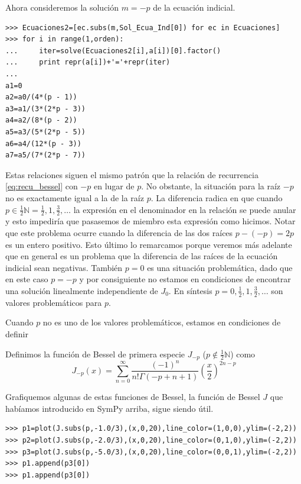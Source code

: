 \documentclass{article}
\begin{document}
Ahora consideremos la solución $m=-p$ de la ecuación indicial.
\begin{lstlisting}
>>> Ecuaciones2=[ec.subs(m,Sol_Ecua_Ind[0]) for ec in Ecuaciones]
>>> for i in range(1,orden):
...     iter=solve(Ecuaciones2[i],a[i])[0].factor()
...     print repr(a[i])+'='+repr(iter)
... 
a1=0
a2=a0/(4*(p - 1))
a3=a1/(3*(2*p - 3))
a4=a2/(8*(p - 2))
a5=a3/(5*(2*p - 5))
a6=a4/(12*(p - 3))
a7=a5/(7*(2*p - 7))

\end{lstlisting}
Estas relaciones siguen el mismo patrón que la relación de recurrencia \eqref{eq:recu_bessel} con $-p$ en lugar de $p$. No obstante, la situación para la raíz $-p$ no es exactamente igual a la de la raíz $p$. La diferencia radica en que cuando $p\in\frac12\mathbb{N}=\frac12,1,\frac32,\ldots$  la expresión en el denominador en la relación
se puede anular y esto  impediría que pasasemos de miembro esta expresión como hicimos. Notar que este problema ocurre cuando la diferencia de las dos raíces $p-(-p)=2p$ es un entero positivo.  Esto último lo remarcamos porque veremos más adelante que en general es un problema que la diferencia de las raíces de la ecuación indicial sean negativas. También $p=0$ es una situación problemática, dado que en este caso $p=-p$ y por consiguiente no estamos en condiciones de encontrar una solución linealmente independiente de $J_0$. En síntesis $p=0,\frac12,1,\frac32,\ldots$ son valores problemáticos para $p$. 

Cuando $p$ no es uno de los valores problemáticos, estamos en condiciones de definir
\begin{definicion}\label{def:bessel_segunda} Definimos la función de Bessel de primera especie $J_{-p}$ ($p\notin\frac12\mathbb{N}$) como
\[J_{-p}(x)=\sum_{n=0}^{\infty}\frac{(-1)^n}{n!\Gamma(-p+n+1)}\left(\frac{x}{2}\right)^{2n-p}\]
\end{definicion}
Grafiquemos algunas de estas funciones de Bessel, la función de Bessel $J$ que habíamos introducido en SymPy arriba, sigue siendo útil.
\begin{lstlisting}
>>> p1=plot(J.subs(p,-1.0/3),(x,0,20),line_color=(1,0,0),ylim=(-2,2))
>>> p2=plot(J.subs(p,-2.0/3),(x,0,20),line_color=(0,1,0),ylim=(-2,2))
>>> p3=plot(J.subs(p,-5.0/3),(x,0,20),line_color=(0,0,1),ylim=(-2,2))
>>> p1.append(p3[0])
>>> p1.append(p3[0])
\end{lstlisting}
\end{document}
